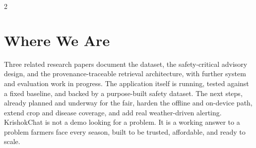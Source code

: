 \documentclass[11pt]{article}
\begin{document}
\begin{multicols}{2}
\section{Where We Are}

Three related research papers document the dataset, the safety-critical advisory design, and the provenance-traceable retrieval architecture, with further system and evaluation work in progress. The application itself is running, tested against a fixed baseline, and backed by a purpose-built safety dataset. The next steps, already planned and underway for the fair, harden the offline and on-device path, extend crop and disease coverage, and add real weather-driven alerting. KrishokChat is not a demo looking for a problem. It is a working answer to a problem farmers face every season, built to be trusted, affordable, and ready to scale.

\end{multicols}
\end{document}
